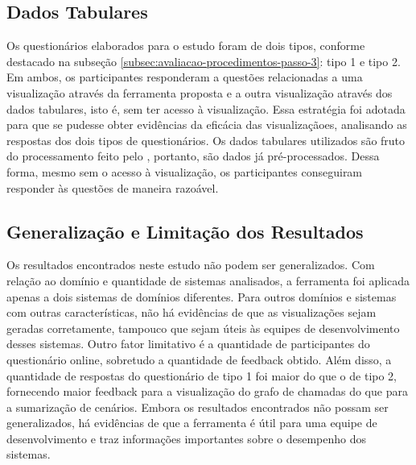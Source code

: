 \subsection{Dados Tabulares}

Os questionários elaborados para o estudo foram de dois tipos, conforme destacado na subseção \ref{subsec:avaliacao-procedimentos-passo-3}: tipo 1 e tipo 2. Em ambos, os participantes responderam a questões relacionadas a uma visualização através da ferramenta proposta e a outra visualização através dos dados tabulares, isto é, sem ter acesso à visualização. Essa estratégia foi adotada para que se pudesse obter evidências da eficácia das visualizaçãoes, analisando as respostas dos dois tipos de questionários. Os dados tabulares utilizados são fruto do processamento feito pelo \textit{\perfMinerName}, portanto, são dados já pré-processados. Dessa forma, mesmo sem o acesso à visualização, os participantes conseguiram responder às questões de maneira razoável.

\subsection{Generalização e Limitação dos Resultados}

Os resultados encontrados neste estudo não podem ser generalizados. Com relação ao domínio e quantidade de sistemas analisados, a ferramenta foi aplicada apenas a dois sistemas de domínios diferentes. Para outros domínios e sistemas com outras características, não há evidências de que as visualizações sejam geradas corretamente, tampouco que sejam úteis às equipes de desenvolvimento desses sistemas. Outro fator limitativo é a quantidade de participantes do questionário online, sobretudo a quantidade de feedback obtido. Além disso, a quantidade de respostas do questionário de tipo 1 foi maior do que o de tipo 2, fornecendo maior feedback para a visualização do grafo de chamadas do que para a sumarização de cenários. Embora os resultados encontrados não possam ser generalizados, há evidências de que a ferramenta é útil para uma equipe de desenvolvimento e traz informações importantes sobre o desempenho dos sistemas.
